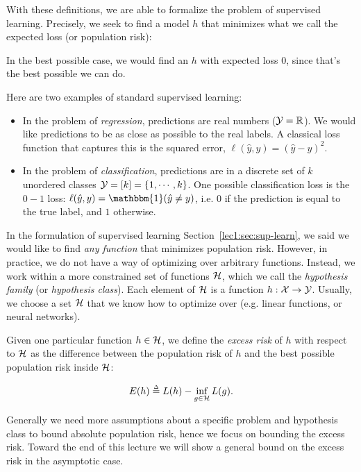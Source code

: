 With these definitions, we are able to formalize the problem of supervised learning. Precisely, we seek to find a model $h$ that minimizes what we call the expected loss (or population risk):



In the best possible case, we would find an $h$ with expected loss $0$, since that's the best possible we can do.


Here are two examples of standard supervised learning:

\begin{itemize}
    \item In the problem of \emph{regression}, predictions are real numbers ($\mathcal Y = \mathbb R$). We would like predictions to be as close as possible to the real labels. A classical loss function that captures this is the squared error, $\ell(\hat{y}, y) = (\hat{y} - y)^2$.
    \item In the problem of \emph{classification}, predictions are in a discrete set of $k$ unordered classes $\mathcal Y = [k] = \{1, \cdots, k \}$. One possible classification loss is the $0-1$ loss: $\ell(\hat{y}, y) = \mathbbm{1}(\hat{y} \neq y)$, i.e. $0$ if the prediction is equal to the true label, and $1$ otherwise.
\end{itemize}




In the formulation of supervised learning Section~\ref{lec1:sec:sup-learn}, we said we would like to find \emph{any function} that minimizes population risk. However, in practice, we do not have a way of optimizing over arbitrary functions. Instead, we work within a more constrained set of functions $\mathcal H$, which we call the \emph{hypothesis family} (or \emph{hypothesis class}). Each element of $\mathcal H$ is a function $h : \mathcal X \rightarrow \mathcal Y$. Usually, we choose a set $\mathcal H$ that we know how to optimize over (e.g. linear functions, or neural networks).

Given one particular function $h \in \mathcal H$, we define the \emph{excess risk} of $h$ with respect to $\mathcal H$ as the difference between the population risk of $h$ and the best possible population risk inside $\mathcal H$:

$$E(h) \defeq{} L(h) - \inf_{g\in\cH} L(g).$$




Generally we need more assumptions about a specific problem and hypothesis class to bound absolute population risk, hence we focus on bounding the excess risk. Toward the end of this lecture we will show a general bound on the excess risk in the asymptotic case.

